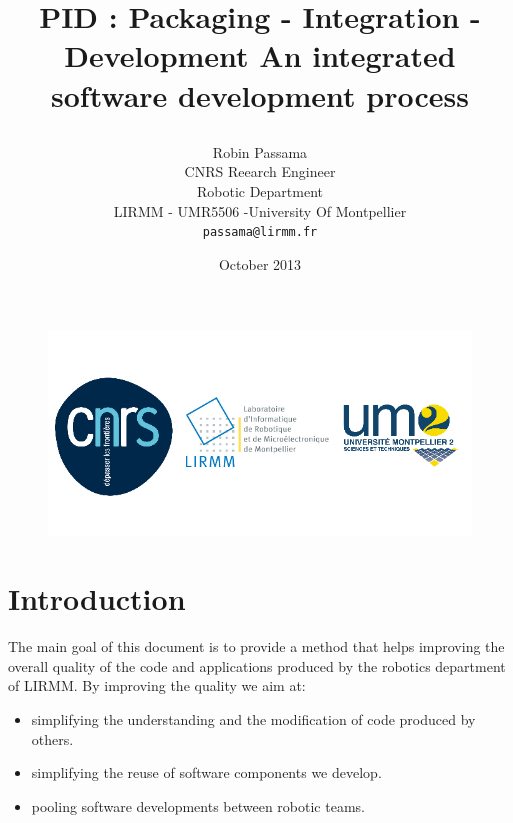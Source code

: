 \documentclass[12pt,a4paper]{article}
\begin{document}
\title{%
    \begin{minipage}\linewidth
        \centering\bfseries\sffamily
        PID : Packaging - Integration - Development 
        \vskip3pt
        \large An integrated software development process
    \end{minipage}
}

\author{
	Robin Passama\\
	CNRS Reearch Engineer\\
	Robotic Department\\	
	LIRMM - UMR5506 -University Of Montpellier\\	
	\texttt{passama@lirmm.fr}}
\date{October 2013}

\maketitle

\bigskip
\bigskip
\bigskip
\bigskip
\bigskip
\bigskip

\begin{figure}
\center
\includegraphics[scale=0.7]{images/logos_officiels.png}
\end{figure}

\pagebreak

\section*{Introduction}
The main goal of this document is to provide a method that helps improving the overall quality of the code and applications produced by the robotics department of LIRMM. By improving the quality we aim at:
\begin{itemize}
\item simplifying the understanding and the modification of code produced by others.
\item simplifying the reuse of software components we develop.
\item pooling software developments between robotic teams.
\end{itemize}
\end{document}
